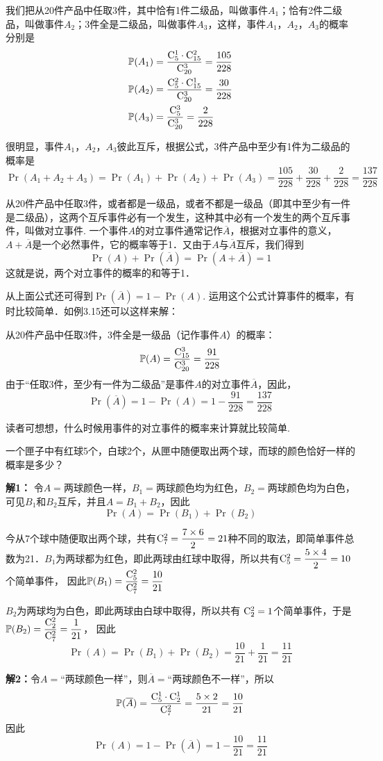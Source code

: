 \begin{solution}
    我们把从20件产品中任取3件，其中恰有1件二级品，叫做事件$A_1$；恰有2件二级品，叫做事件$A_2$；3件全是二级品，叫做事件$A_3$，这样，事件$A_1$，$A_2$，$A_3$的概率分别是
\[\begin{split}
    \mathbb{P}(A_1)&=\dfrac{{\rm C}^{1}_{5}\cdot {\rm C}^{2}_{15}}{{\rm C}^{3}_{20}}=\dfrac{105}{228}\\
    \mathbb{P}(A_2)&=\dfrac{{\rm C}^{2}_{5}\cdot {\rm C}^{1}_{15}}{{\rm C}^{3}_{20}}=\dfrac{30}{228}\\
    \mathbb{P}(A_3)&=\dfrac{{\rm C}^{3}_{5}}{{\rm C}^{3}_{20}}=\dfrac{2}{228}\\
\end{split}\]

很明显，事件$A_1$，$A_2$，$A_3$彼此互斥，根据公式，3件产品中至少有1件为二级品的概率是
\[\Pr(A_1+A_2+A_3)=\Pr(A_1)+\Pr(A_2)+\Pr(A_3)=\frac{105}{228}+\frac{30}{228}+\frac{2}{228}=\frac{137}{228}\]

从20件产品中任取3件，或者都是一级品，或者不都是一级品（即其中至少有一件是二级品），这两个互斥事件必有一个发生，这种其中必有一个发生的两个互斥事件，叫做对立事件. 一个事件$A$的对立事件通常记作$\overline{A}$，根据对立事件的意义，$A+\overline{A}$是一个必然事件，它的概率等于1．又由于$A$与$\overline{A}$互斥，我们得到
\[\Pr(A)+\Pr(\overline{A})=\Pr(A+\overline{A})=1\]
这就是说，两个对立事件的概率的和等于1．

从上面公式还可得到$\Pr(\overline{A})=1-\Pr(A)$. 
运用这个公式计算事件的概率，有时比较简单．如例3.15还可以这样来解：

从20件产品中任取3件，3件全是一级品（记作事件$A$）的概率：
\[\mathbb{P}(A)=\dfrac{{\rm C}^{3}_{15}}{{\rm C}^{3}_{20}}=\dfrac{91}{228}\]
由于“任取3件，至少有一件为二级品”是事件$A$的对立事件$\overline{A}$，因此，
\[\Pr(\overline{A})=1-\Pr(A)=1-\frac{91}{228}=\frac{137}{228}\]

读者可想想，什么时候用事件的对立事件的概率来计算就比较简单.
\end{solution}

\begin{example}
一个匣子中有红球5个，白球2个，从匣中随便取出两个球，而球的颜色恰好一样的概率是多少？
\end{example}

\begin{solution}
\textbf{解1：} 令$A=$两球颜色一样，$B_1=$两球颜色均为红色，$B_2=$两球颜色均为白色，可见$B_1$和$B_2$互斥，并且$A=B_1+B_2$，因此
\[\Pr(A)=\Pr(B_1)+\Pr(B_2)\]

今从7个球中随便取出两个球，共有${\rm C}^{2}_{7}=\dfrac{7\times 6}{2}=21$种不同的取法，即简单事件总数为21．$B_1$为两球都为红色，即此两球由红球中取得，所以共有${\rm C}^{2}_{5}=\dfrac{5\times4}{2}=10$个简单事件，
因此$\mathbb{P}(B_1)=\dfrac{{\rm C}^{2}_{5}}{{\rm C}^{2}_{7}}=\dfrac{10}{21}$

$B_2$为两球均为白色，即此两球由白球中取得，所以共有
${\rm C}^{2}_{2}=1$个简单事件，于是$\mathbb{P}(B_2)=\dfrac{{\rm C}^{2}_{2}}{{\rm C}^{2}_{7}}=\dfrac{1}{21}$，
因此
\[\Pr(A)=\Pr(B_1)+\Pr(B_2)=\frac{10}{21}+\frac{1}{21}=\frac{11}{21}\]

\textbf{解2：}令$A=$“两球颜色一样”，则$\overline{A}=$“两球颜色不一样”，所以
\[\mathbb{P}(\overline{A})=\dfrac{{\rm C}^{1}_{5}\cdot {\rm C}^{1}_{2}}{{\rm C}^{2}_{7}}=\dfrac{5\times 2}{21}=\dfrac{10}{21}\]
因此
\[\Pr(A)=1-\Pr(\overline{A})=1-\frac{10}{21}=\frac{11}{21}\]
\end{solution}

